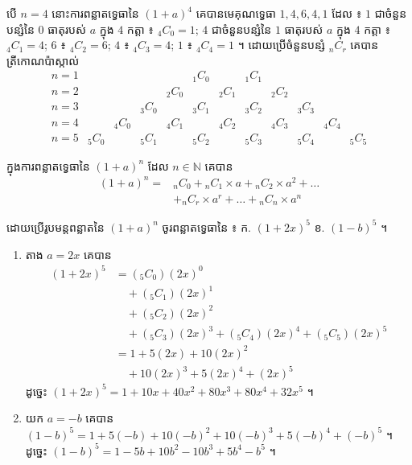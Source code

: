 បើ $n = 4$ នោះការពន្លាតទ្វេធានៃ $(1 + a)^4$ គេបានមេគុណទ្វេធា $1, 4, 6, 4, 1$ ដែល ៖ $1$ ជាចំនួនបន្សំនៃ $0$ ធាតុរបស់ $a$ ក្នុង $4$ កត្តា ៖ ${}_4C_0 = 1$; $4$ ជាចំនួនបន្សំនៃ $1$ ធាតុរបស់ $a$ ក្នុង $4$ កត្តា ៖ ${}_4C_1 = 4$; $6$ ៖ ${}_4C_2 = 6$; $4$ ៖ ${}_4C_3 = 4$; $1$ ៖ ${}_4C_4 = 1$ ។ ដោយប្រើចំនួនបន្សំ ${}_nC_r$ គេបានត្រីកោណប៉ាស្កាល់
\[
\begin{array}{c|ccccccccccc}
n = 1 & &&&& {}_1C_0 && {}_1C_1 &&&&\\
n = 2 & &&& {}_2C_0 && {}_2C_1 && {}_2C_2 &&&\\
n = 3 & && {}_3C_0 && {}_3C_1 && {}_3C_2 && {}_3C_3 &&\\
n = 4 & & {}_4C_0 && {}_4C_1 && {}_4C_2 && {}_4C_3 && {}_4C_4 &\\
n = 5 & {}_5C_0 && {}_5C_1 && {}_5C_2 && {}_5C_3 && {}_5C_4 && {}_5C_5
\end{array}
\]

\begin{formulaBox}[ជាទូទៅ]
ក្នុងការពន្លាតទ្វេធានៃ $(1 + a)^n$ ដែល $n \in \mathbb{N}$ គេបាន
\[ \begin{aligned} (1 + a)^n = {}&{}_nC_0 + {}_nC_1\times a + {}_nC_2\times a^2 + \dots\\ &+ {}_nC_r\times a^r + \dots + {}_nC_n\times a^n \end{aligned} \]
\end{formulaBox}

\begin{example}[លំហាត់គំរូ ១]
ដោយប្រើរូបមន្តពន្លាតនៃ $(1 + a)^n$ ចូរពន្លាតទ្វេធានៃ ៖ \quad ក. $(1 + 2x)^5$ \quad ខ. $(1 - b)^5$ ។
\end{example}
\ans
\begin{enumerate}[a]
  \item តាង $a = 2x$ គេបាន
  \[ \begin{aligned}
(1 + 2x)^5 &= ({}_5C_0)(2x)^0\\
&\quad + ({}_5C_1)(2x)^1\\
&\quad + ({}_5C_2)(2x)^2\\
&\quad + ({}_5C_3)(2x)^3 + ({}_5C_4)(2x)^4 + ({}_5C_5)(2x)^5\\
&= 1 + 5(2x) + 10(2x)^2\\
&\quad + 10(2x)^3 + 5(2x)^4 + (2x)^5
\end{aligned} \]
  ដូច្នេះ $(1 + 2x)^5 = 1 + 10x + 40x^2 + 80x^3 + 80x^4 + 32x^5$ ។
  \item យក $a = -b$ គេបាន $(1 - b)^5 = 1 + 5(-b) + 10(-b)^2 + 10(-b)^3 + 5(-b)^4 + (-b)^5$ ។ ដូច្នេះ $(1 - b)^5 = 1 - 5b + 10b^2 - 10b^3 + 5b^4 - b^5$ ។
\end{enumerate}


